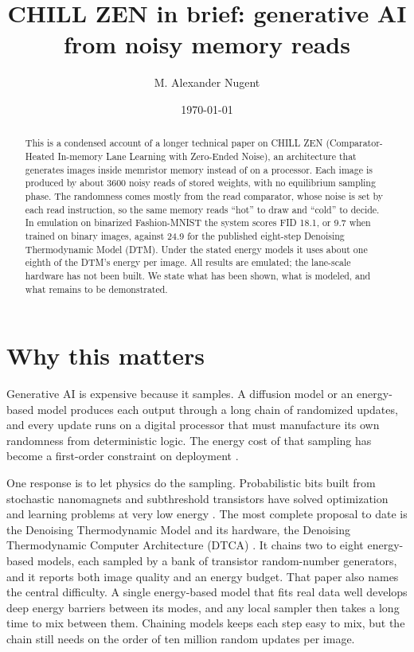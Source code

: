 \documentclass[reprint,amsmath,amssymb,aps,nofootinbib]{revtex4-2}
\begin{document}
\title{CHILL ZEN in brief: generative AI from noisy memory reads}

\author{M. Alexander Nugent}

\date{\today}

\begin{abstract}
This is a condensed account of a longer technical paper on CHILL ZEN
(Comparator-Heated In-memory Lane Learning with Zero-Ended Noise), an
architecture that generates images inside memristor memory instead of
on a processor. Each image is produced by about 3600 noisy reads of
stored weights, with no equilibrium sampling phase. The randomness
comes mostly from the read comparator, whose noise is set by each read
instruction, so the same memory reads ``hot'' to draw and ``cold'' to
decide. In emulation on binarized Fashion-MNIST the system scores FID
18.1, or 9.7 when trained on binary images, against 24.9 for the
published eight-step Denoising Thermodynamic Model (DTM). Under the
stated energy models it uses about one eighth of the DTM's energy per
image. All results are emulated; the lane-scale hardware has not been
built. We state what has been shown, what is modeled, and what remains
to be demonstrated.
\end{abstract}

\maketitle

\section{Why this matters}

Generative AI is expensive because it samples. A diffusion model or an
energy-based model produces each output through a long chain of
randomized updates, and every update runs on a digital processor that
must manufacture its own randomness from deterministic logic. The
energy cost of that sampling has become a first-order constraint on
deployment \cite{conte2019thermodynamic}.

One response is to let physics do the sampling. Probabilistic bits
built from stochastic nanomagnets and subthreshold transistors have
solved optimization and learning problems at very low energy
\cite{sutton2017intrinsic,borders2019integer,niazi2024training}.
The most complete proposal to date is the Denoising Thermodynamic
Model and its hardware, the Denoising Thermodynamic Computer
Architecture (DTCA) \cite{jelincic2025dtm}. It chains two to eight
energy-based models, each sampled by a bank of transistor random-number
generators, and it reports both image quality and an energy budget.
That paper also names the central difficulty. A single energy-based
model that fits real data well develops deep energy barriers between
its modes, and any local sampler then takes a long time to mix between
them. Chaining models keeps each step easy to mix, but the chain still
needs on the order of ten million random updates per image.
\end{document}
